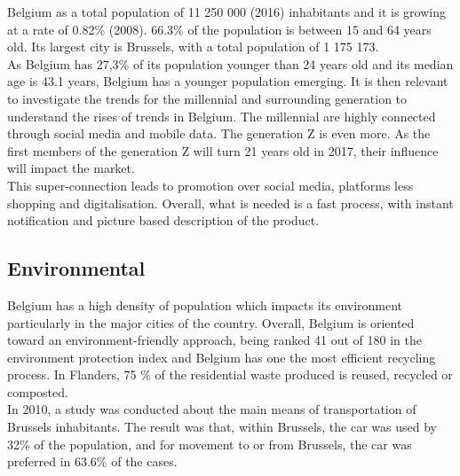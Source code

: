 \documentclass[12pt,a4paper,oneside]{book}
\begin{document}
Belgium as a total population of 11 250 000 (2016) inhabitants and it is growing at a rate of 0.82\% (2008). 66.3\% of the population is between 15 and 64 years old. Its largest city is Brussels, with a total population of 1 175 173\cite{ciafb}.\\


As Belgium has 27,3\% of its population younger than 24 years old and its median age is 43.1 years, Belgium has a younger population emerging\cite{ciafb}. It is then relevant to investigate the trends for the millennial and surrounding generation to understand the rises of trends in Belgium. The millennial are highly connected through social media and mobile data. The generation Z is even more. As the first members of the generation Z will turn 21 years old in 2017, their influence will impact the market.\\
This super-connection leads to promotion over social media, platforms less shopping and digitalisation. Overall, what is needed is a fast process, with instant notification and picture based description of the product\cite{stbe}.



\subsection{Environmental}

Belgium has a high density of population which impacts its environment particularly in the major cities of the country. Overall, Belgium is oriented toward an environment-friendly approach, being ranked 41 out of 180 in the environment protection index\cite{epi} and Belgium has one the most efficient recycling process. In Flanders, 75 \% of the residential waste produced is reused, recycled or composted\cite{wastemana}.\\

In 2010, a study was conducted about the main means of transportation of Brussels inhabitants. The result was that, within Brussels, the car was used by 32\% of the population, and for movement to or from Brussels, the car was preferred in 63.6\% of the cases.\cite{mtpd}
\end{document}
